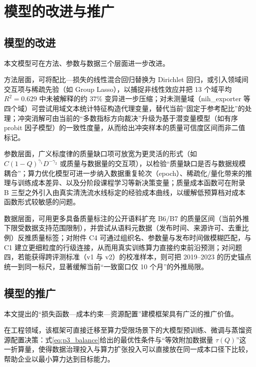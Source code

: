 \section{模型的改进与推广}

\subsection{模型的改进}

本文模型可在方法、参数与数据三个层面进一步改进。

方法层面，可将配比—损失的线性混合回归替换为 Dirichlet 回归，或引入领域间交互项与稀疏先验（如 Group Lasso），以捕捉非线性效应并把 13 个域平均 $R^2=0.629$ 中未被解释的约 $37\%$ 变异进一步压缩；对未测量域（nih\_exporter 等四个域）可尝试用域文本统计特征构造代理变量，替代当前“固定于参考配比”的处理；冲突消解可由当前的“多数指标方向裁决”升级为基于潜变量模型（如有序 probit 因子模型）的一致性度量，从而给出冲突样本的质量可信度区间而非二值标记。

参数层面，广义标度律的质量缺口项可放宽为更灵活的形式（如 $C(1-Q)^{\gamma_1}D^{-\gamma_2}$ 或质量与数据量的交互项），以检验“质量缺口是否与数据规模耦合”；算力优化模型可进一步纳入数据重复轮次（epoch）、稀疏化/量化带来的推理与训练成本差异、以及分阶段课程学习等新决策变量；质量成本函数可在附录 B 三型之外引入由真实清洗流水线标定的经验成本曲线，以缓解低预算档对成本函数形式较敏感的问题。

数据层面，可用更多具备质量标注的公开语料扩充 B6/B7 的质量区间（当前外推下限受数据支持范围限制），并尝试从语料元数据（发布时间、来源许可、去重比例）反推质量标签；对附件 C4 可通过组织名、参数量与发布时间做模糊匹配，与 C1 建立更细粒度的行级连接，从而用真实训练算力直接约束前沿预测；对问题四，若能获得跨评测标准（v1 与 v2）的校准样本，则可把 2019--2023 的历史锚点统一到同一标尺，显著缓解当前“一致窗口仅 10 个月”的外推局限。

\subsection{模型的推广}

本文提出的“损失函数—成本约束—资源配置”建模框架具有广泛的推广价值。

在工程领域，该框架可直接迁移至算力受限场景下的大模型预训练、微调与蒸馏资源配置决策：式\eqref{eq:p3_balance}给出的最优性条件与“等效附加数据量 $\tau(Q)$”这一折算量，使得数据治理投入与算力扩张投入可以直接放在同一成本口径下比较，帮助企业以最小算力达到目标能力。

